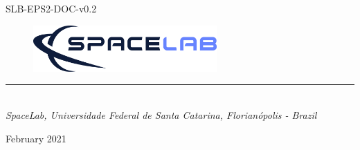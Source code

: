 %
%
%
%
%

%
%
%
%
%
%

\begin{titlepage}

\thispagestyle{empty}

\begin{flushleft}
SLB-EPS2-DOC-v0.2
\end{flushleft}

\begin{figure}[!ht]
    \begin{flushleft}
        \includegraphics[width=7cm]{figures/spacelab-logo-full-color-rgb-1000px@72ppi.png}
    \end{flushleft}
\end{figure}

\begin{flushleft}
\Huge{\textbf{\thetitle}}
\rule[0pt]{\textwidth}{5pt}
\end{flushleft}

\vspace{0.2cm}

\begin{flushleft}
\textit{\thetitle} \\
\textit{SpaceLab, Universidade Federal de Santa Catarina, Florianópolis - Brazil}
\end{flushleft}

\vfill
\vfill

\begin{flushright}
February 2021
\end{flushright}

\end{titlepage}
